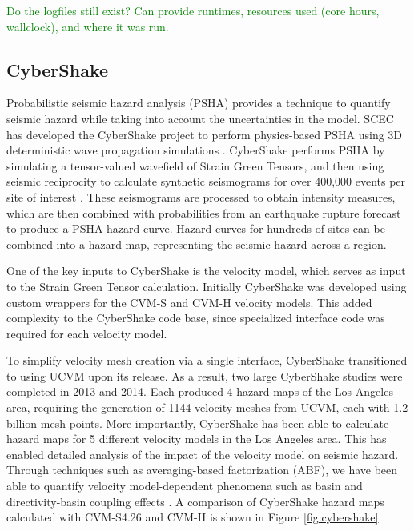 \textcolor{green}{Do the logfiles still exist? Can provide runtimes, resources used (core hours, wallclock), and where it was run.}



\subsection{CyberShake}

Probabilistic seismic hazard analysis (PSHA) provides a technique to quantify seismic hazard while taking into account the uncertainties in the model.  SCEC has developed the CyberShake project to perform physics-based PSHA using 3D deterministic wave propagation simulations \citep{Graves_2011_PAG}.  CyberShake performs PSHA by simulating a tensor-valued wavefield of Strain Green Tensors, and then using seismic reciprocity to calculate synthetic seismograms for over 400,000 events per site of interest \citep{Zhao_2006_BSSA}.  These seismograms are processed to obtain intensity measures, which are then combined with probabilities from an earthquake rupture forecast to produce a PSHA hazard curve.  Hazard curves for hundreds of sites can be combined into a hazard map, representing the seismic hazard across a region.

One of the key inputs to CyberShake is the velocity model, which serves as input to the Strain Green Tensor calculation.  Initially CyberShake was developed using custom wrappers for the CVM-S and CVM-H velocity models.  This added complexity to the CyberShake code base, since specialized interface code was required for each velocity model.

To simplify velocity mesh creation via a single interface, CyberShake transitioned to using UCVM upon its release. As a result, two large CyberShake studies were completed in 2013 \citep{Callaghan_2013_Proc} and 2014.  Each produced 4 hazard maps of the Los Angeles area, requiring the generation of 1144 velocity meshes from UCVM, each with 1.2 billion mesh points.  More importantly, CyberShake has been able to calculate hazard maps for 5 different velocity models in the Los Angeles area.  This has enabled detailed analysis of the impact of the velocity model on seismic hazard.  Through techniques such as averaging-based factorization (ABF), we have been able to quantify velocity model-dependent phenomena such as basin and directivity-basin coupling effects \citep{Wang_2014_BSSA}.  A comparison of CyberShake hazard maps calculated with CVM-S4.26 and CVM-H is shown in Figure \ref{fig:cybershake}.



